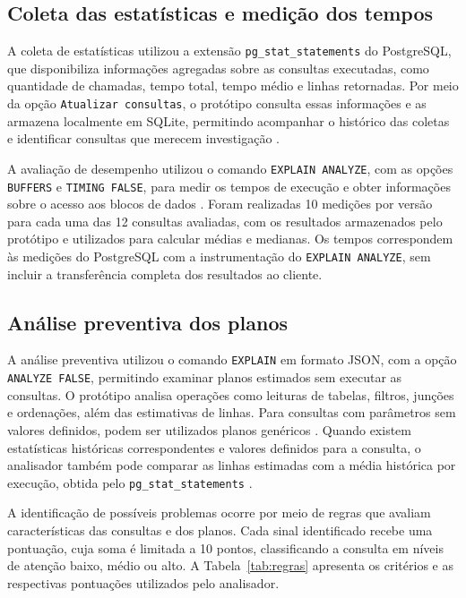 \documentclass{UNESC}
\newcommand{\codigo}[1]{\texttt{#1}}
\begin{document}
\subsection{Coleta das estatísticas e medição dos tempos}

A coleta de estatísticas utilizou a extensão \codigo{pg\_stat\_statements} do PostgreSQL, que disponibiliza informações agregadas sobre as consultas executadas, como quantidade de chamadas, tempo total, tempo médio e linhas retornadas. Por meio da opção \codigo{Atualizar consultas}, o protótipo consulta essas informações e as armazena localmente em SQLite, permitindo acompanhar o histórico das coletas e identificar consultas que merecem investigação \cite{postgresql2026pgstat}.

A avaliação de desempenho utilizou o comando \codigo{EXPLAIN ANALYZE}, com as opções \codigo{BUFFERS} e \codigo{TIMING FALSE}, para medir os tempos de execução e obter informações sobre o acesso aos blocos de dados \cite{postgresql2026explain}. Foram realizadas 10 medições por versão para cada uma das 12 consultas avaliadas, com os resultados armazenados pelo protótipo e utilizados para calcular médias e medianas. Os tempos correspondem às medições do PostgreSQL com a instrumentação do \codigo{EXPLAIN ANALYZE}, sem incluir a transferência completa dos resultados ao cliente.

\subsection{Análise preventiva dos planos}

A análise preventiva utilizou o comando \codigo{EXPLAIN} em formato JSON, com a opção \codigo{ANALYZE FALSE}, permitindo examinar planos estimados sem executar as consultas. O protótipo analisa operações como leituras de tabelas, filtros, junções e ordenações, além das estimativas de linhas. Para consultas com parâmetros sem valores definidos, podem ser utilizados planos genéricos \cite{postgresql2026explain}. Quando existem estatísticas históricas correspondentes e valores definidos para a consulta, o analisador também pode comparar as linhas estimadas com a média histórica por execução, obtida pelo \codigo{pg\_stat\_statements} \cite{postgresql2026pgstat}.

A identificação de possíveis problemas ocorre por meio de regras que avaliam características das consultas e dos planos. Cada sinal identificado recebe uma pontuação, cuja soma é limitada a 10 pontos, classificando a consulta em níveis de atenção baixo, médio ou alto. A Tabela~\ref{tab:regras} apresenta os critérios e as respectivas pontuações utilizados pelo analisador.
\end{document}
